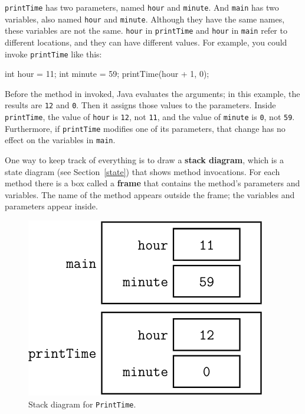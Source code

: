 \documentclass[12pt]{book}
\theoremstyle{exercise}
\newcommand{\java}[1]{\verb"#1"}
\begin{document}
\java{printTime} has two parameters, named \java{hour} and \java{minute}.
And \java{main} has two variables, also named \java{hour} and \java{minute}.
Although they have the same names, these variables are not the same.
\java{hour} in \java{printTime} and \java{hour} in \java{main} refer to different locations, and they can have different values.
For example, you could invoke \java{printTime} like this:

\begin{code}
        int hour = 11;
        int minute = 59;
        printTime(hour + 1, 0);
\end{code}

Before the method in invoked, Java evaluates the arguments; in this example, the results are \java{12} and \java{0}.
Then it assigns those values to the parameters.
Inside \java{printTime}, the value of \java{hour} is \java{12}, not \java{11}, and the value of \java{minute} is \java{0}, not \java{59}.
Furthermore, if \java{printTime} modifies one of its parameters, that change has no effect on the variables in \java{main}.


One way to keep track of everything is to draw a {\bf stack diagram}, which is a state diagram (see Section~\ref{state}) that shows method invocations.
For each method there is a box called a {\bf frame} that contains the method's parameters and variables.
The name of the method appears outside the frame; the variables and parameters appear inside.

\begin{figure}[!ht]
\begin{center}
\includegraphics[scale=0.9]{figs/stack.pdf}
\caption{Stack diagram for \java{PrintTime}.}
\label{fig:stack}
\end{center}
\end{figure}
\end{document}

